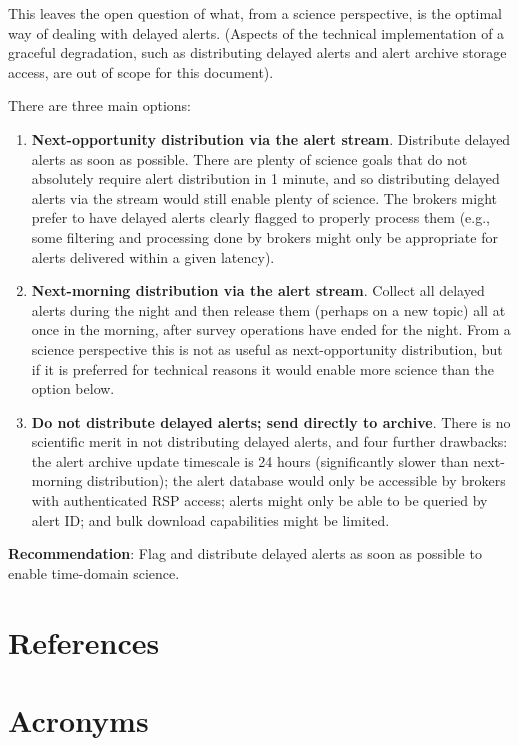 \documentclass[DM,authoryear,toc]{lsstdoc}
\begin{document}
This leaves the open question of what, from a science perspective, is the optimal way of dealing with delayed alerts.
(Aspects of the technical implementation of a graceful degradation, such as distributing delayed alerts and alert archive storage access, are out of scope for this document).

There are three main options:

\begin{enumerate}
\item \textbf{Next-opportunity distribution via the alert stream}.
Distribute delayed alerts as soon as possible.
There are plenty of science goals that do not absolutely require alert distribution in 1 minute, and so distributing delayed alerts via the stream would still enable plenty of science.
The brokers might prefer to have delayed alerts clearly flagged to properly process them (e.g., some filtering and processing done by brokers might only be appropriate for alerts delivered within a given latency).
\item \textbf{Next-morning distribution via the alert stream}.
Collect all delayed alerts during the night and then release them (perhaps on a new topic) all at once in the morning, after survey operations have ended for the night.
From a science perspective this is not as useful as next-opportunity distribution, but if it is preferred for technical reasons it would enable more science than the option below.
\item \textbf{Do not distribute delayed alerts; send directly to archive}.
There is no scientific merit in not distributing delayed alerts, and four further drawbacks: the alert archive update timescale is 24 hours (significantly slower than next-morning distribution); the alert database would only be accessible by brokers with authenticated RSP access; alerts might only be able to be queried by alert ID; and bulk download capabilities might be limited.
\end{enumerate}

\textbf{Recommendation}: Flag and distribute delayed alerts as soon as possible to enable time-domain science.

\appendix
\section{References} \label{sec:bib}
\renewcommand{\refname}{} %


\section{Acronyms} \label{sec:acronyms}

\end{document}
